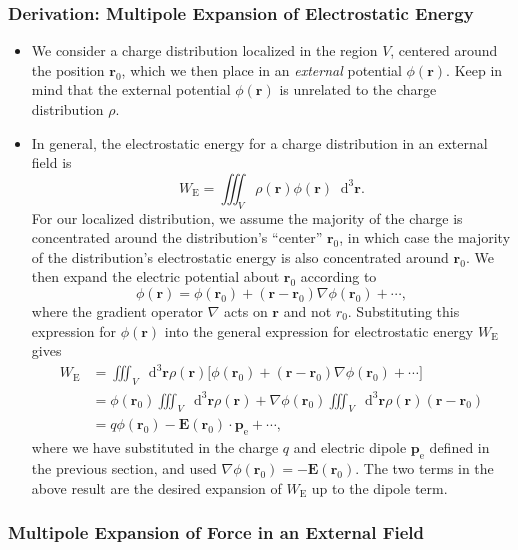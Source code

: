 \documentclass[11pt, a4paper]{article}
\newcommand{\diff}{\mathop{}\!\mathrm{d}} %
\newcommand{\dr}{\diff^{3} \r}  %
\renewcommand{\vec}[1]{\bm{#1}} %
\renewcommand{\r}{\vec{r}}
\newcommand{\E}{\vec{E}} %
\newcommand{\pe}{\vec{p}_{\text{e}}}  %
\renewcommand{\grad}{\nabla}
\begin{document}
\subsubsection{Derivation: Multipole Expansion of Electrostatic Energy}
\begin{itemize}
    \item We consider a charge distribution localized in the region $ V $, centered around the position $ \r_{0} $, which we then place in an \textit{external} potential $ \phi(\r) $. Keep in mind that the external potential $ \phi(\r) $ is unrelated to the charge distribution $ \rho $.
	
	\item In general, the electrostatic energy for a charge distribution in an external field is
	\begin{equation*}
		W_{\text{E}} = \iiint_{V} \rho(\r) \phi(\r) \dr.
	\end{equation*}
	For our localized distribution, we assume the majority of the charge is concentrated around the distribution's ``center'' $ \r_{0} $, in which case the majority of the distribution's electrostatic energy is also concentrated around $ \r_{0} $. We then expand the electric potential about $ \r_{0} $ according to
	\begin{equation*}
		\phi(\r) = \phi(\r_{0}) + (\r - \r_{0}) \grad \phi(\r_{0}) + \cdots,
	\end{equation*}
    where the gradient operator $ \grad $ acts on $ \r $ and not $ r_{0} $. Substituting this expression for $ \phi(\r) $ into the general expression for electrostatic energy $ W_{\text{E}} $ gives
	\begin{align*}
		W_{\text{E}} &= \iiint_{V}\dr \rho(\r)\big[\phi(\r_{0}) + (\r - \r_{0})\grad \phi(\r_{0}) + \cdots \big]\\
		& = \phi(\r_{0}) \iiint_{V} \dr \rho(\r) + \grad \phi(\r_{0}) \iiint_{V} \dr \rho(\r)(\r - \r_{0})\\
		& = q \phi(\r_{0}) - \E(\r_{0}) \cdot \pe + \cdots,
	\end{align*}
    where we have substituted in the charge $ q $ and electric dipole $ \pe $ defined in the previous section, and used $ \grad\phi(\r_{0}) = - \E(\r_{0}) $. The two terms in the above result are the desired expansion of $ W_{\text{E}} $ up to the dipole term.
	
\end{itemize}

\subsubsection{Multipole Expansion of Force in an External Field}
\end{document}
